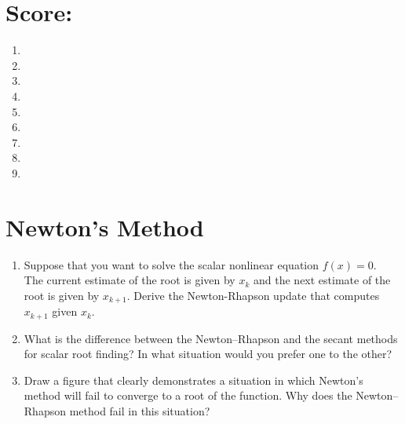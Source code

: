 \vspace{1em}

\section*{Score:  \scoreMark}
\vspace{1em}
\begin{large}
\begin{multicols}{2}
\begin{enumerate}  \setlength\itemsep{1.1em} \setlength\itemindent{36pt}
\item \scoreMark
\item \scoreMark
\item \scoreMark
\item \scoreMark
\item \scoreMark
\item \scoreMark
\item \scoreMark
\item \scoreMark
\item \scoreMark
\end{enumerate}
\end{multicols}
\end{large}


\renewcommand{\theenumi}{\Alph{enumi}}


\pagebreak
\section{Newton's Method}

\begin{enumerate}
  \item Suppose that you want to solve the scalar nonlinear equation $f(x) = 0$. \\
        The current estimate of the root is given by $x_k$
        and the next estimate of the root is given by $x_{k+1}$.
        Derive the Newton-Rhapson update that computes $x_{k+1}$ given $x_k$.
  \vspace{25em}
  \item What is the difference between the Newton--Rhapson
        and the secant methods for scalar root finding?
        In what situation would you prefer one to the other?

  \pagebreak
  \item Draw a figure that clearly demonstrates a situation in which
        Newton's method will fail to converge to a root of the function.
        Why does the Newton--Rhapson method fail in this situation?
  \vspace{25em}
\end{enumerate}


